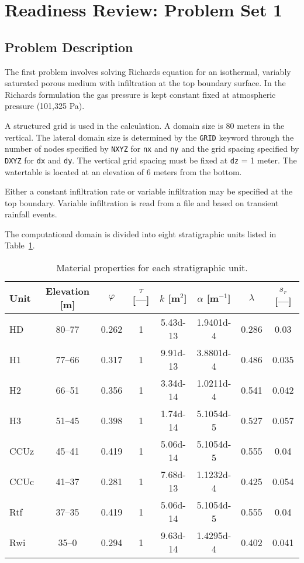 \documentclass[12pt]{article}
\renewcommand{\a}{{\alpha}}
\begin{document}
\section{Readiness Review: Problem Set 1}

\subsection{Problem Description}

The first problem involves solving Richards equation for an isothermal, variably saturated porous medium with infiltration at the top boundary surface. In the Richards formulation the gas pressure is kept constant fixed at atmospheric pressure (101,325 Pa).

A structured grid is used in the calculation.
A domain size is 80 meters in the vertical. The lateral domain size is determined by the {\tt GRID} keyword through the number of nodes specified by {\tt NXYZ} for {\tt nx} and {\tt ny} and the grid spacing specified by {\tt DXYZ} for {\tt dx} and {\tt dy}. The vertical grid spacing must be fixed at {\tt dz} = 1 meter. The watertable is located at an elevation of 6 meters from the bottom. 

Either a constant infiltration rate or variable infiltration may be specified at the top boundary. Variable infiltration is read from a file and based on transient rainfall events.

The computational domain is divided into eight stratigraphic units listed in Table~\ref{tstrata}.

\begin{table}[h]\centering
\caption{Material properties for each stratigraphic unit.}\label{tstrata}
\vspace{3mm}
\begin{tabular}{lccccccc}
\toprule
Unit & Elevation [m] & $\varphi$ & $\tau$ [---] & $k$ [m$^2$] & $\a$ [m$^{-1}$] & $\lambda$ & $s_r$ [---] \\
\midrule
HD & 80--77 & 0.262 & 1 & 5.43d-13 & 1.9401d-4 & 0.286 & 0.03 \\ 
H1 & 77--66 & 0.317 & 1 & 9.91d-13 & 3.8801d-4 & 0.486 & 0.035\\
H2 & 66--51 & 0.356 & 1 & 3.34d-14 & 1.0211d-4 & 0.541 & 0.042\\
H3 & 51--45 & 0.398 & 1 & 1.74d-14 & 5.1054d-5 & 0.527 & 0.057\\
CCUz & 45--41 & 0.419 & 1 & 5.06d-14 & 5.1054d-5 & 0.555 & 0.04\\
CCUc & 41--37 & 0.281 & 1 & 7.68d-13 & 1.1232d-4 & 0.425 & 0.054\\
Rtf & 37--35 & 0.419 & 1 & 5.06d-14 & 5.1054d-5 & 0.555 & 0.04 \\
Rwi &  35--0 & 0.294 & 1 & 9.63d-14 & 1.4295d-4 & 0.402 & 0.041\\
\bottomrule
\end{tabular}
\end{table}
\end{document}

